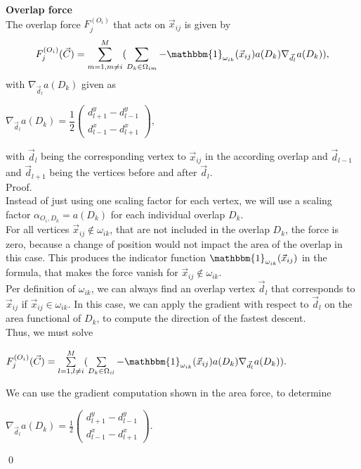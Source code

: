 \begin{proposition} \textbf{Overlap force} \\
    The overlap force $F_j^{(O_i)}$ that acts on $\vec{x}_{ij}$ is given by
   \begin{align}
       F_j^{(O_i)}(\vec{C}) = \sum\limits_{m=1, m\neq i}^{M} ( \sum\limits_{D_k \in \Omega_{im}} - \mathbbm{1}_{\omega_{ik}}(\vec{x}_{ij})  a(D_k)\nabla_{\vec{d}_{l}} a(D_k)),
   \end{align}
   with $\nabla_{\vec{d}_{l}} a(D_k)$ given as
   \begin{center}
       $\nabla_{\vec{d}_{l}} a(D_k) = 
           \dfrac{1}{2}\begin{pmatrix}	d_{l+1}^{y} - d_{l-1}^{y} \\d_{l-1}^{x} - d_{l+1}^{x}	\end{pmatrix},
       $
   \end{center}
   with $\vec{d}_{l}$ being the corresponding vertex to $\vec{x}_{ij}$ in the according overlap and $\vec{d}_{l-1}$ and $\vec{d}_{l+1}$ being the vertices before and after $\vec{d}_{l}$. \\
   Proof. \\
   Instead of just using one scaling factor for each vertex, we will use a scaling factor $\alpha_{O_i, D_k} = a(D_k)$ for each individual overlap $D_k$. \\
   For all vertices $\vec{x}_{ij} \notin \omega_{ik}$, that are not included in the overlap $D_k$, the force is zero, because a change of position would not impact the area of the overlap in this case. This produces the indicator function $\mathbbm{1}_{\omega_{ik}}(\vec{x}_{ij})$ in the formula, that makes the force vanish for $\vec{x}_{ij} \notin \omega_{ik}$. \\
   Per definition of $\omega_{ik}$, we can always find an overlap vertex $\vec{d}_l$ that corresponds to $\vec{x}_{ij}$ if $\vec{x}_{ij} \in \omega_{ik}$. In this case, we can apply the gradient with respect to $\vec{d}_l$ on the area functional of $D_k$, to compute the direction of the fastest descent. \\	
   Thus, we must solve 
   \begin{center}
       $
       F_j^{(O_i)}(\vec{C}) = \sum\limits_{l=1, l\neq i}^{M} ( \sum\limits_{D_k \in \Omega_{il}} -\mathbbm{1}_{\omega_{ik}}(\vec{x}_{ij}) a(D_k) \nabla_{\vec{d}_l} a(D_k)).
       $
   \end{center}
   We can use the gradient computation shown in the area force, to determine
   \begin{center}
       $
       \nabla_{\vec{d}_l} a(D_k) = \frac{1}{2} 
       \begin{pmatrix}	d_{l+1}^{y} - d_{l-1}^{y} \\d_{l-1}^{x} - d_{l+1}^{x}	\end{pmatrix}
       $.
   \end{center}
   \qed
\end{proposition}

